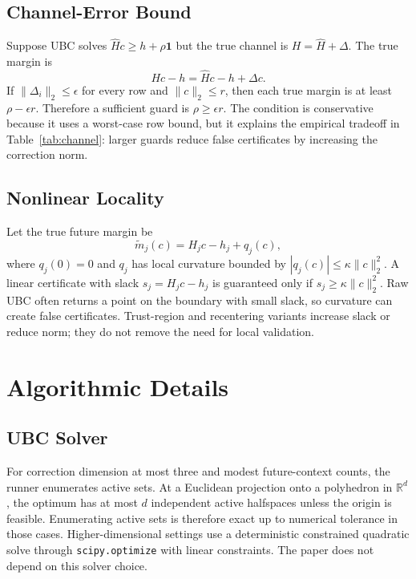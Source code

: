 \documentclass{article}
\newcommand{\R}{\mathbb{R}}
\begin{document}
\subsection{Channel-Error Bound}

Suppose UBC solves $\hat Hc\ge h+\rho\mathbf{1}$ but the true channel is
$H=\hat H+\Delta$. The true margin is
\begin{equation}
    Hc-h = \hat Hc-h+\Delta c.
\end{equation}
If $\|\Delta_i\|_2\le \epsilon$ for every row and $\|c\|_2\le r$, then each true
margin is at least $\rho-\epsilon r$. Therefore a sufficient guard is
$\rho\ge \epsilon r$. The condition is conservative because it uses a worst-case
row bound, but it explains the empirical tradeoff in Table~\ref{tab:channel}:
larger guards reduce false certificates by increasing the correction norm.

\subsection{Nonlinear Locality}

Let the true future margin be
\begin{equation}
    \tilde m_j(c)=H_jc-h_j+q_j(c),
\end{equation}
where $q_j(0)=0$ and $q_j$ has local curvature bounded by
$|q_j(c)|\le \kappa \|c\|_2^2$. A linear certificate with slack $s_j=H_jc-h_j$
is guaranteed only if $s_j\ge \kappa\|c\|_2^2$. Raw UBC often returns a point on
the boundary with small slack, so curvature can create false certificates.
Trust-region and recentering variants increase slack or reduce norm; they do
not remove the need for local validation.

\section{Algorithmic Details}

\subsection{UBC Solver}

For correction dimension at most three and modest future-context counts, the
runner enumerates active sets. At a Euclidean projection onto a polyhedron in
$\R^d$, the optimum has at most $d$ independent active halfspaces unless the
origin is feasible. Enumerating active sets is therefore exact up to numerical
tolerance in those cases. Higher-dimensional settings use a deterministic
constrained quadratic solve through \texttt{scipy.optimize} with linear
constraints. The paper does not depend on this solver choice.
\end{document}
